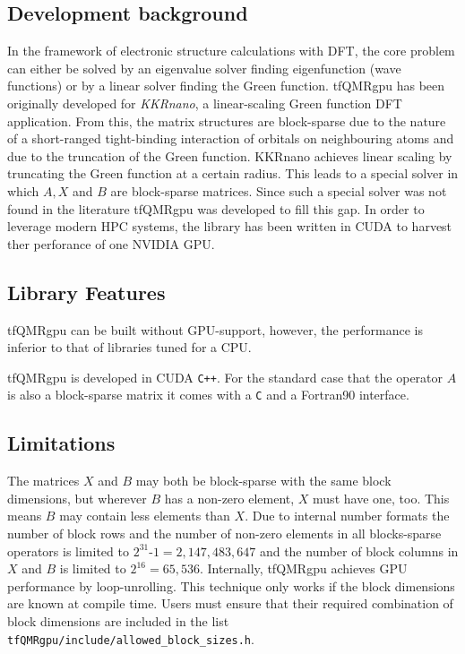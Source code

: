 \documentclass[oribibl]{llncs}
\newcommand{\ttt}[1]{\texttt{#1}}
\newcommand{\codename}{tfQMRgpu}
\begin{document}
\subsection{Development background} \label{sec:backstory}
%
In the framework of electronic structure calculations with \ac{DFT},
the core problem can either be solved by an eigenvalue solver finding eigenfunction (wave functions)
or by a linear solver finding the Green function.
\codename{} has been originally developed for \emph{KKRnano}, a linear-scaling Green function \ac{DFT} application.
From this, the matrix structures are block-sparse due to the nature of a short-ranged tight-binding interaction of orbitals on neighbouring atoms and due to the truncation of the Green function.
KKRnano achieves linear scaling by truncating the Green function at a certain radius.
This leads to a special solver in which $A, X$ and $B$ are block-sparse matrices.
Since such a special solver was not found in the literature \codename{} was developed to fill this gap.
In order to leverage modern \ac{HPC} systems, the library has been written in CUDA
to harvest ther perforance of one NVIDIA \ac{GPU}.

\subsection{Library Features} \label{sec:features}
%
\codename{} can be built without \ac{GPU}-support, however,
the performance is inferior to that of libraries tuned for a \ac{CPU}.

\noindent
\codename{} is developed in CUDA \ttt{C++}.
For the standard case that the operator $A$ is also a block-sparse matrix
it comes with a \ttt{C} and a Fortran90 interface.

\subsection{Limitations}
%
The matrices $X$ and $B$ may both be block-sparse with the same block dimensions, but
wherever $B$ has a non-zero element, $X$ must have one, too.
This means $B$ may contain less elements than $X$.
Due to internal number formats the number of block rows 
and the number of non-zero elements in all blocks-sparse operators 
is limited to $2^{31}$-$1 = 2,147,483,647$ 
and the number of block columns in $X$ and $B$ 
is limited to $2^{16} = 65,536$.
Internally, \codename{} achieves \ac{GPU} performance by loop-unrolling.
This technique only works if the block dimensions are known at compile time.
Users must ensure that their required combination of block dimensions are included in the list
\ttt{tfQMRgpu/include/allowed\_block\_sizes.h}.
\end{document}
